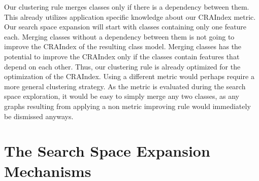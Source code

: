 \documentclass[submission,copyright,creativecommons]{eptcs}
\begin{document}
Our clustering rule merges classes only if there is a dependency between them. 
This already utilizes application specific knowledge about our CRAIndex metric. Our 
search space expansion will start with classes containing only one feature each. Merging 
classes without a dependency between them is not going to improve the CRAIndex of 
the resulting class model. Merging classes has the potential to improve the CRAIndex only 
if the classes contain features that depend on each other. Thus, our clustering rule 
is already optimized for the optimization of the CRAIndex. Using a different metric would 
perhaps require a more general clustering strategy. As the metric is evaluated 
during the search space exploration, it would be easy to simply merge any two 
classes, as any graphs resulting from applying a non metric improving rule 
would immediately be dismissed anyways.


\section{The Search Space Expansion Mechanisms}
\label{sec:expansion}
\end{document}
